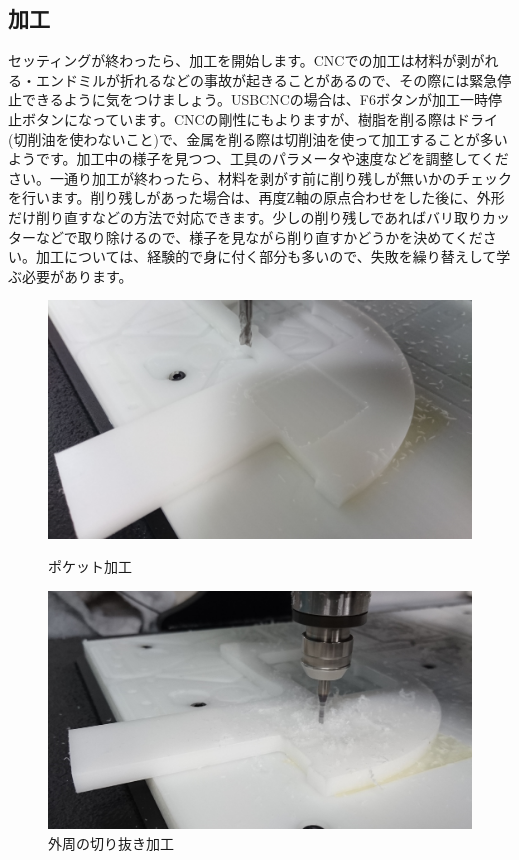 \documentclass[b5paper, 9pt, twocolumn, titlepage,openany]{jsbook}%
\begin{document}
\subsection{加工}
セッティングが終わったら、加工を開始します。CNCでの加工は材料が剥がれる・エンドミルが折れるなどの事故が起きることがあるので、その際には緊急停止できるように気をつけましょう。USBCNCの場合は、F6ボタンが加工一時停止ボタンになっています。CNCの剛性にもよりますが、樹脂を削る際はドライ(切削油を使わないこと)で、金属を削る際は切削油を使って加工することが多いようです。加工中の様子を見つつ、工具のパラメータや速度などを調整してください。一通り加工が終わったら、材料を剥がす前に削り残しが無いかのチェックを行います。削り残しがあった場合は、再度Z軸の原点合わせをした後に、外形だけ削り直すなどの方法で対応できます。少しの削り残しであればバリ取りカッターなどで取り除けるので、様子を見ながら削り直すかどうかを決めてください。加工については、経験的で身に付く部分も多いので、失敗を繰り替えして学ぶ必要があります。\\

\begin{figure}[tbh]
  \begin{center}
    \begin{minipage}{0.7\columnwidth}
      \includegraphics[width=\columnwidth]{pocket_milling_now.jpg}
    \end{minipage}
    \caption{ポケット加工\label{pocket_now}}
    \begin{minipage}{0.7\columnwidth}
      \includegraphics[width=\columnwidth]{milling_now_trim.jpg}
    \end{minipage}
    \caption{外周の切り抜き加工\label{outer_now}}
  \end{center}
\end{figure}
\end{document}
